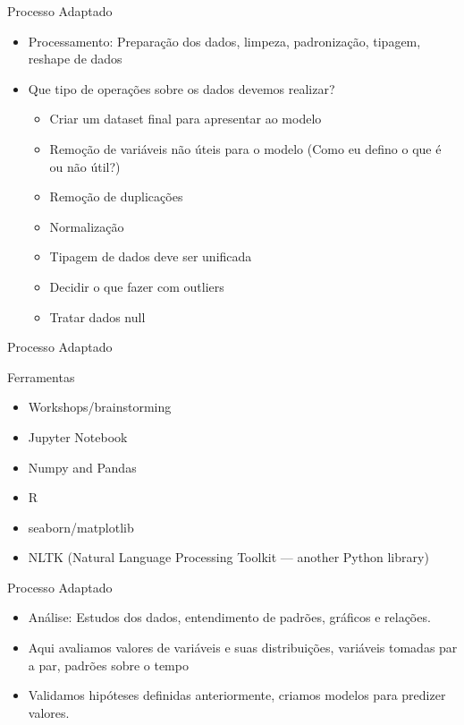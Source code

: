 \begin{frame}
	\begin{block}{Processo Adaptado}
		\begin{itemize}
		\item Processamento: Preparação dos dados, limpeza, padronização, tipagem, reshape de dados
		\item Que tipo de operações sobre os dados devemos realizar?
			\begin{itemize}
				\item Criar um dataset final para apresentar ao modelo
				\item Remoção de variáveis não úteis para o modelo (Como eu defino o que é ou não útil?)
				\item Remoção de duplicações
				\item Normalização
				\item Tipagem de dados deve ser unificada
				\item Decidir o que fazer com outliers
				\item Tratar dados null
			\end{itemize}
				
		\end{itemize}
	\end{block}
\end{frame}
    

\begin{frame}
	\begin{block}{Processo Adaptado}
	
		Ferramentas
		\begin{itemize}
			\item Workshops/brainstorming
			\item Jupyter Notebook
			\item Numpy and Pandas
			\item R
			\item seaborn/matplotlib
			\item NLTK (Natural Language Processing Toolkit — another Python library)
		\end{itemize}
	\end{block}
\end{frame}


\begin{frame}
	\begin{block}{Processo Adaptado}
		\begin{itemize}
		\item Análise: Estudos dos dados, entendimento de padrões, gráficos e relações.
		\item Aqui avaliamos valores de variáveis e suas distribuições, variáveis tomadas par a par, padrões sobre o tempo
		\item Validamos hipóteses definidas anteriormente, criamos modelos para predizer valores.
		
		\end{itemize}
	\end{block}
\end{frame}
    

